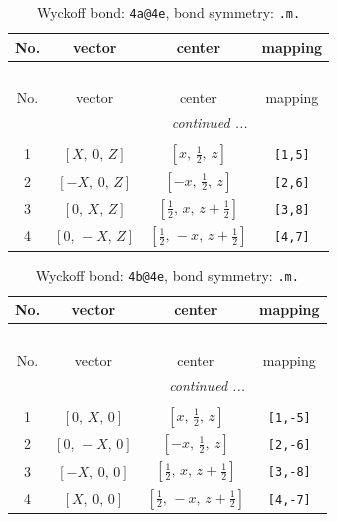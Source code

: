 \documentclass[fleqn,8pt]{jsarticle}
\begin{document}
\begin{longtable}{cccc}
\caption{Wyckoff bond: {\tt 4a@4e}, bond symmetry: {\tt .m.}}
 \\
 \hline \hline
No. & vector & center & mapping \\ \hline \endfirsthead

\multicolumn{3}{l}{\tablename\ \thetable{}} \\
 \hline \hline
No. & vector & center & mapping \\ \hline \endhead

 \hline \hline
\multicolumn{3}{r}{\footnotesize\it continued ...} \\ \endfoot

 \hline \hline
\multicolumn{3}{r}{} \\ \endlastfoot

1 & $\left[ X,\, 0,\, Z \right]$ & $\left[ x,\, \frac{1}{2},\, z \right]$ & {\tt [1,5]} \\ \hline
2 & $\left[ - X,\, 0,\, Z \right]$ & $\left[ - x,\, \frac{1}{2},\, z \right]$ & {\tt [2,6]} \\ \hline
3 & $\left[ 0,\, X,\, Z \right]$ & $\left[ \frac{1}{2},\, x,\, z + \frac{1}{2} \right]$ & {\tt [3,8]} \\ \hline
4 & $\left[ 0,\, - X,\, Z \right]$ & $\left[ \frac{1}{2},\, - x,\, z + \frac{1}{2} \right]$ & {\tt [4,7]} \\
\end{longtable}
\renewcommand{\arraystretch}{1.2}
\begin{longtable}{cccc}
\caption{Wyckoff bond: {\tt 4b@4e}, bond symmetry: {\tt .m.}}
 \\
 \hline \hline
No. & vector & center & mapping \\ \hline \endfirsthead

\multicolumn{3}{l}{\tablename\ \thetable{}} \\
 \hline \hline
No. & vector & center & mapping \\ \hline \endhead

 \hline \hline
\multicolumn{3}{r}{\footnotesize\it continued ...} \\ \endfoot

 \hline \hline
\multicolumn{3}{r}{} \\ \endlastfoot

1 & $\left[ 0,\, X,\, 0 \right]$ & $\left[ x,\, \frac{1}{2},\, z \right]$ & {\tt [1,-5]} \\ \hline
2 & $\left[ 0,\, - X,\, 0 \right]$ & $\left[ - x,\, \frac{1}{2},\, z \right]$ & {\tt [2,-6]} \\ \hline
3 & $\left[ - X,\, 0,\, 0 \right]$ & $\left[ \frac{1}{2},\, x,\, z + \frac{1}{2} \right]$ & {\tt [3,-8]} \\ \hline
4 & $\left[ X,\, 0,\, 0 \right]$ & $\left[ \frac{1}{2},\, - x,\, z + \frac{1}{2} \right]$ & {\tt [4,-7]} \\
\end{longtable}
\end{document}
